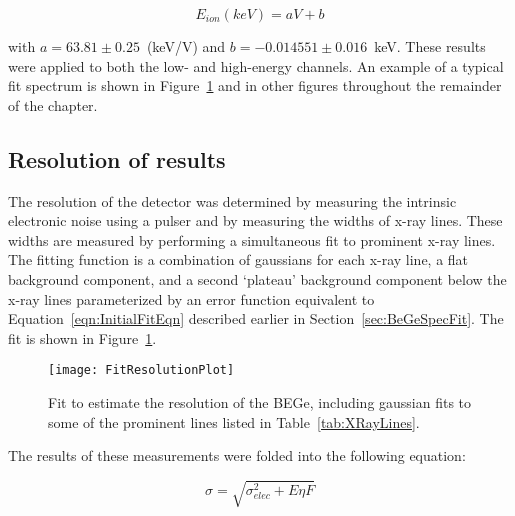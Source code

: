 			\[
			E_{ion} (keV) = a V + b
			\]  

with $a = 63.81\pm0.25$~(keV/V) and $b = -0.014551\pm0.016$~keV.  These results were applied to both the low- and high-energy channels.  An example of a typical fit spectrum is shown in Figure~\ref{fig:BeGeResFit} and in other figures throughout the remainder of the chapter.

		\subsection{Resolution of results}

The resolution of the detector was determined by measuring the intrinsic electronic noise using a pulser and by measuring the widths of x-ray lines.  These widths are measured by performing a simultaneous fit to prominent x-ray lines.  The fitting function is a combination of gaussians for each x-ray line, a flat background component, and a second `plateau' background component below the x-ray lines parameterized by an error function equivalent to Equation~\ref{eqn:InitialFitEqn} described earlier in Section~\ref{sec:BeGeSpecFit}.  The fit is shown in Figure~\ref{fig:BeGeResFit}.  
			\begin{figure}
				\centering
				\texttt{[image: FitResolutionPlot]}
				\caption[Estimate of BEGe resolution]
				{Fit to estimate the resolution of the BEGe, including gaussian fits to some of the prominent lines listed in Table~\ref{tab:XRayLines}.}
				\label{fig:BeGeResFit}
			\end{figure}
The results of these measurements were folded into the following equation:

			\begin{equation}
				\sigma = \sqrt{\sigma_{elec}^{2} + E \eta F}
				\label{eqn:SigmaEqn}
			\end{equation}

